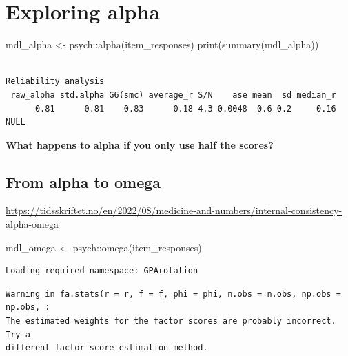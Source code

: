 \documentclass[
  letterpaper,
  DIV=11,
  numbers=noendperiod]{scrreprt}
\newenvironment{Shaded}{\begin{snugshade}}{\end{snugshade}}
\newcommand{\FunctionTok}[1]{\textcolor[rgb]{0.28,0.35,0.67}{#1}}
\newcommand{\NormalTok}[1]{\textcolor[rgb]{0.00,0.23,0.31}{#1}}
\newcommand{\OtherTok}[1]{\textcolor[rgb]{0.00,0.23,0.31}{#1}}
\newcommand{\SpecialCharTok}[1]{\textcolor[rgb]{0.37,0.37,0.37}{#1}}
\begin{document}
\hypertarget{exploring-alpha}{%
\chapter{Exploring alpha}\label{exploring-alpha}}

\begin{Shaded}
\begin{Highlighting}[]
\NormalTok{mdl\_alpha }\OtherTok{\textless{}{-}}\NormalTok{ psych}\SpecialCharTok{::}\FunctionTok{alpha}\NormalTok{(item\_responses)}
\FunctionTok{print}\NormalTok{(}\FunctionTok{summary}\NormalTok{(mdl\_alpha))}
\end{Highlighting}
\end{Shaded}

\begin{verbatim}

Reliability analysis   
 raw_alpha std.alpha G6(smc) average_r S/N    ase mean  sd median_r
      0.81      0.81    0.83      0.18 4.3 0.0048  0.6 0.2     0.16
NULL
\end{verbatim}

\textbf{What happens to alpha if you only use half the scores?}

\hypertarget{from-alpha-to-omega}{%
\section{From alpha to omega}\label{from-alpha-to-omega}}

\url{https://tidsskriftet.no/en/2022/08/medicine-and-numbers/internal-consistency-alpha-omega}

\begin{Shaded}
\begin{Highlighting}[]
\NormalTok{mdl\_omega }\OtherTok{\textless{}{-}}\NormalTok{ psych}\SpecialCharTok{::}\FunctionTok{omega}\NormalTok{(item\_responses)}
\end{Highlighting}
\end{Shaded}

\begin{verbatim}
Loading required namespace: GPArotation
\end{verbatim}

\begin{verbatim}
Warning in fa.stats(r = r, f = f, phi = phi, n.obs = n.obs, np.obs = np.obs, :
The estimated weights for the factor scores are probably incorrect.  Try a
different factor score estimation method.
\end{verbatim}
\end{document}
